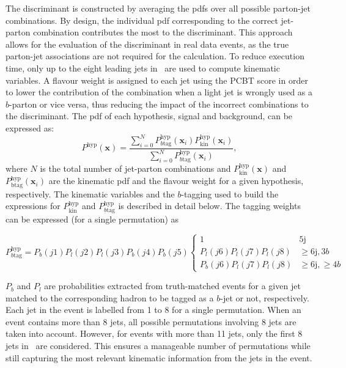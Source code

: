 The discriminant is constructed by averaging the pdfs over all possible parton-jet combinations. By design, the individual pdf corresponding to the correct jet-parton combination contributes the most to the discriminant. This approach allows for the evaluation of the discriminant in real data events, as the true parton-jet associations are not required for the calculation. To reduce execution time, only up to the eight leading jets in \pT\ are used to compute kinematic variables. A flavour weight is assigned to each jet using the PCBT score in order to lower the contribution of the combination when a light jet is wrongly used as a $b$-parton or vice versa, thus reducing the impact of the incorrect combinations to the discriminant. The pdf of each hypothesis, signal and background, can be expressed as:
\begin{equation}
    P^{\text{hyp}}(\textbf{x})=\frac{\sum_{i=0}^N P^{\text{hyp}}_{b\text{tag}}(\textbf{x}_i)P^{\text{hyp}}_{\text{kin}}(\textbf{x}_i)}{\sum_{i=0}^N P^{\text{hyp}}_{b\text{tag}}(\textbf{x}_i)},
    \label{eq3:PDF}
\end{equation}
where $N$ is the total number of jet-parton combinations and $P^{\text{hyp}}_{\text{kin}}(\textbf{x})$ and $P^{\text{hyp}}_{\text{btag}}(\textbf{x}_i)$ are the kinematic pdf and the flavour weight for a given hypothesis, respectively. The kinematic variables and the $b$-tagging used to build the expressions for $P^{\text{hyp}}_{\text{kin}}$ and $P^{\text{hyp}}_{b\text{tag}}$ is described in detail below. The tagging weights can be expressed (for a single permutation) as

\begin{equation}
    P^{\text{hyp}}_{b\text{tag}}=P_b(j1)P_l(j2)P_l(j3)P_b(j4)P_b(j5)\begin{cases}1&5\text{j}\\P_l(j6)P_l(j7)P_l(j8)& \geq6\text{j},3b\\P_b(j6)P_l(j7)P_l(j8)&\geq6\text{j},\geq4b\end{cases}
\end{equation}

$P_b$ and $P_l$ are probabilities extracted from truth-matched events for a given jet matched to the corresponding hadron to be tagged as a $b$-jet or not, respectively. Each jet in the event is labelled from 1 to 8 for a single permutation. When an event contains more than 8 jets, all possible permutations involving 8 jets are taken into account. However, for events with more than 11 jets, only the first 8 jets in \pT\ are considered. This ensures a manageable number of permutations while still capturing the most relevant kinematic information from the jets in the event.\\

